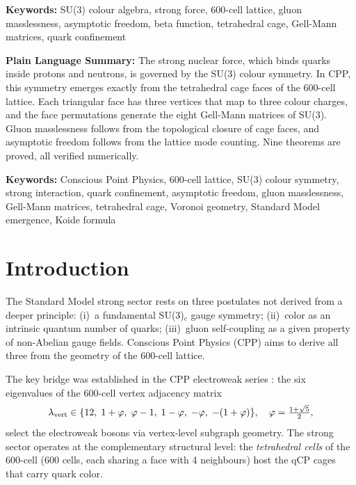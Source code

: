 \documentclass[11pt,letterpaper]{article}
\newcommand{\phig}{\varphi}
\begin{document}
\medskip\noindent
\textbf{Keywords:} SU(3) colour algebra, strong force, 600-cell lattice, gluon masslessness, asymptotic freedom, beta function, tetrahedral cage, Gell-Mann matrices, quark confinement

\bigskip\noindent
\textbf{Plain Language Summary:}
The strong nuclear force, which binds quarks inside protons and neutrons, is governed by the SU(3) colour symmetry. In CPP, this symmetry emerges exactly from the tetrahedral cage faces of the 600-cell lattice. Each triangular face has three vertices that map to three colour charges, and the face permutations generate the eight Gell-Mann matrices of SU(3). Gluon masslessness follows from the topological closure of cage faces, and asymptotic freedom follows from the lattice mode counting. Nine theorems are proved, all verified numerically.

\bigskip
\raggedright


\noindent\textbf{Keywords:} Conscious Point Physics, 600-cell lattice,
SU(3) colour symmetry, strong interaction, quark confinement, asymptotic
freedom, gluon masslessness, Gell-Mann matrices, tetrahedral cage,
Voronoi geometry, Standard Model emergence, Koide formula

\raggedright

\tableofcontents
\newpage

\section{Introduction}

The Standard Model strong sector rests on three postulates not
derived from a deeper principle: (i)~a fundamental SU(3)$_c$ gauge
symmetry; (ii)~color as an intrinsic quantum number of quarks;
(iii)~gluon self-coupling as a given property of non-Abelian gauge
fields.  Conscious Point Physics (CPP) aims to derive all three from
the geometry of the 600-cell lattice.

The key bridge was established in the CPP electroweak series
\citep{cpp_ew_unified}: the six eigenvalues of the 600-cell vertex
adjacency matrix
\begin{equation}
\lambda_{\rm vert} \in
\{12,\;1+\phig,\;\phig-1,\;1-\phig,\;-\phig,\;-(1+\phig)\},
\quad\phig = \tfrac{1+\sqrt5}{2},
\label{eq:vertex_spectrum}
\end{equation}
select the electroweak bosons via vertex-level subgraph geometry.
The strong sector operates at the complementary structural level:
the \emph{tetrahedral cells} of the 600-cell (600 cells, each
sharing a face with 4 neighbours) host the qCP cages that carry
quark color.
\end{document}

